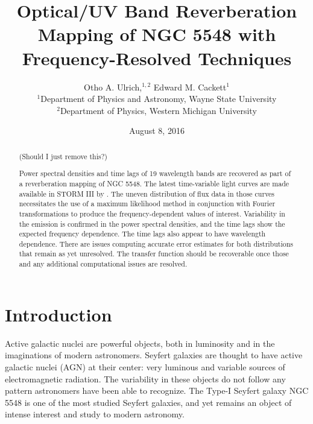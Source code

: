 \documentclass[11pt,letterpaper]{article}
\begin{document}
\title{Optical/UV Band
Reverberation Mapping of NGC 5548 with Frequency-Resolved Techniques}

\author{Otho A. Ulrich,$^{1,2}$ Edward M. Cackett$^{1}$
\\
$^{1}$Department of Physics and Astronomy, Wayne State University\\
$^{2}$Department of Physics, Western Michigan University\\
}
\date{August 8, 2016}

\maketitle

\begin{abstract}

(Should I just remove this?)

Power spectral densities and time lags of 19 wavelength bands are recovered as part of a reverberation mapping of NGC 5548. The latest time-variable light curves are made available in STORM III by \cite{2016ApJ...821...56F}. The uneven distribution of flux data in those curves necessitates the use of a maximum likelihood method in conjunction with Fourier transformations to produce the frequency-dependent values of interest. Variability in the emission is confirmed in the power spectral densities, and the time lags show the expected frequency dependence. The time lags also appear to have wavelength dependence. There are issues computing accurate error estimates for both distributions that remain as yet unresolved. The transfer function should be recoverable once those and any additional computational issues are resolved.

\end{abstract}

\section{Introduction}

Active galactic nuclei are powerful objects, both in luminosity and in the imaginations of modern astronomers. 
Seyfert galaxies are thought to have active galactic nuclei (AGN) at their center: very luminous and variable sources of electromagnetic radiation. The variability in these objects do not follow any pattern astronomers have been able to recognize. The Type-I Seyfert galaxy NGC 5548 is one of the most studied Seyfert galaxies, and yet remains an object of intense interest and study to modern astronomy. 
\end{document}
